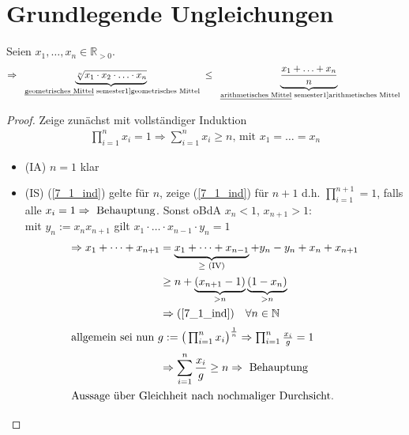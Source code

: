 \section{Grundlegende Ungleichungen}
\begin{proposition}
	Seien $x_1, \dotsc, x_n\in\mathbb{R}_{>0}$.\\
	\[\Rightarrow \underbrace{\sqrt[n]{x_1\cdot x_2\cdot \dotsc \cdot x_n}}_{\text{\begriff{geometrisches Mittel}}} \le \underbrace{\frac{x_1 + \dotsc + x_n}{n}}_{\text{\begriff{arithmetisches Mittel}}}\]
\end{proposition}
\begin{proof}
	Zeige zunächst mit vollständiger Induktion\\
	\begin{align} %
	\prod_{i=1}^{n}x_i=1 \Rightarrow \sum\limits_{i=1}^{n} x_i \geq n \text{, mit } x_1=\dots=x_n \label{7_1_ind}
	\end{align}
	\begin{itemize}
		\item (IA) $n = 1$ klar
		\item (IS) (\ref{7_1_ind}) gelte für $n$, zeige (\ref{7_1_ind}) für $n+1$ d.h. $\prod_{i=1}^{n+1} = 1$, falls alle $x_i=1 \Rightarrow \text{ Behauptung}$. Sonst oBdA $x_n < 1$, $x_{n+1} > 1:$\\ mit $y_n:=x_n x_{n+1}$ gilt $x_1\cdot\dots\cdot x_{n-1}\cdot y_n=1$
		\begin{align*}
		\Rightarrow x_1 + \dots + x_{n+1} &= \underbrace{x_1+\dots+x_{n-1}}_{\geq \text{ (IV)}} + y_n - y_n + x_n+x_{n+1}\\ 
		&\geq n + \underbrace{(x_{n+1} -1)}_{>n}\underbrace{(1-x_n)}_{>n}\\ 
		&\Rightarrow (\ref{7_1_ind}) \quad\forall n \in \mathbb{N}\\ 
		\shortintertext{allgemein sei nun $g:=\big( \prod_{i=1}^{n} x_i \big)^{\frac{1}{n}} \Rightarrow \prod_{i=1}^{n} \frac{x_i}{g} = 1$}
		&\Rightarrow \sum\limits_{i=1}^{n} \frac{x_i}{g} \geq n \Rightarrow \text{ Behauptung}\\ 
		\shortintertext{Aussage über Gleichheit nach nochmaliger Durchsicht.}
		\end{align*}
	\end{itemize} 
\end{proof}

